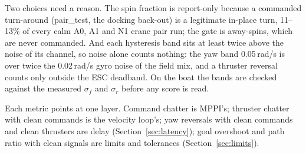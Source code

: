\noindent Two choices need a reason. The spin fraction is report-only because a commanded
turn-around (pair\_test, the docking back-out) is a legitimate in-place turn, 11--13\% of every calm
A0, A1 and N1 crane pair run; the gate is away-spins, which are never commanded. And each hysteresis band sits at least twice above the noise of its channel, so noise alone
counts nothing: the yaw band 0.05\,rad/s is over twice the 0.02\,rad/s gyro noise of the field
mix, and a thruster reversal counts only outside the ESC deadband. On the boat the bands are
checked against the measured $\sigma_f$ and $\sigma_r$ before any score is read.

Each metric points at one layer. Command chatter is MPPI's; thruster chatter with clean
commands is the velocity loop's; yaw reversals with clean commands and clean thrusters are delay
(Section~\ref{sec:latency}); goal overshoot and path ratio with clean signals are limits and
tolerances (Section~\ref{sec:limits}).
